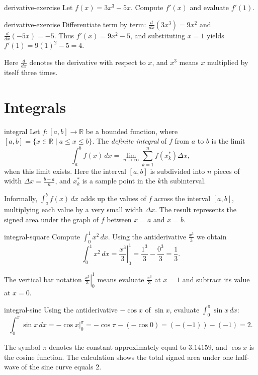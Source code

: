 \documentclass[11pt,a4paper]{article}
\begin{document}
\begin{exercise}{}{derivative-exercise}
Let $f(x)=3x^3-5x$. Compute $f'(x)$ and evaluate $f'(1)$.
\end{exercise}

\begin{exercisesolution}{derivative-exercise}
Differentiate term by term: $\frac{d}{dx}(3x^3)=9x^2$ and $\frac{d}{dx}(-5x)=-5$. Thus $f'(x)=9x^2-5$, and substituting $x=1$ yields $f'(1)=9(1)^2-5=4$.
\end{exercisesolution}
Here $\frac{d}{dx}$ denotes the derivative with respect to $x$, and $x^3$ means $x$ multiplied by itself three times.

\section{Integrals}

\begin{definition}{}{integral}
Let $f\colon [a,b]\to \mathbb{R}$ be a bounded function, where $[a,b]=\{x\in\mathbb{R}\mid a\le x\le b\}$. The \emph{definite integral} of $f$ from $a$ to $b$ is the limit
\[
\int_a^b f(x)\,dx=\lim_{n\to\infty}\sum_{k=1}^{n} f(x_k^*)\Delta x,
\]
when this limit exists. Here the interval $[a,b]$ is subdivided into $n$ pieces of width $\Delta x=\frac{b-a}{n}$, and $x_k^*$ is a sample point in the $k$th subinterval.
\end{definition}
Informally, $\int_a^b f(x)\,dx$ adds up the values of $f$ across the interval $[a,b]$, multiplying each value by a very small width $\Delta x$. The result represents the signed area under the graph of $f$ between $x=a$ and $x=b$.

\begin{example}{}{integral-square}
Compute $\int_0^1 x^2\,dx$. Using the antiderivative $\frac{x^3}{3}$ we obtain
\[
\int_0^1 x^2\,dx=\left.\frac{x^3}{3}\right|_{0}^{1}=\frac{1^3}{3}-\frac{0^3}{3}=\frac{1}{3}.
\]
\end{example}
The vertical bar notation $\left.\frac{x^3}{3}\right|_{0}^{1}$ means evaluate $\frac{x^3}{3}$ at $x=1$ and subtract its value at $x=0$.

\begin{example}{}{integral-sine}
Using the antiderivative $-\cos x$ of $\sin x$, evaluate $\int_{0}^{\pi}\sin x\,dx$:
\[
\int_{0}^{\pi}\sin x\,dx=\left.-\cos x\right|_{0}^{\pi}=-\cos \pi-(-\cos 0)=(-(-1))-(-1)=2.
\]
\end{example}
The symbol $\pi$ denotes the constant approximately equal to $3.14159$, and $\cos x$ is the cosine function. The calculation shows the total signed area under one half-wave of the sine curve equals $2$.
\end{document}
